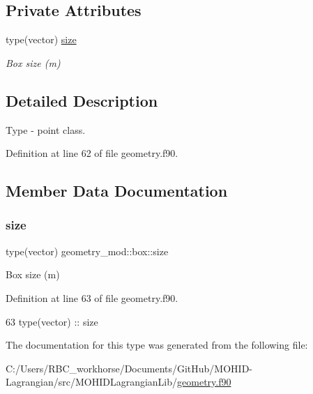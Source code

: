 \subsection*{Private Attributes}
\begin{DoxyCompactItemize}
\item 
type(vector) \mbox{\hyperlink{structgeometry__mod_1_1box_aca87e2761faa8b1ce447347a31fd26f9}{size}}
\begin{DoxyCompactList}\small\item\em Box size (m) \end{DoxyCompactList}\end{DoxyCompactItemize}


\subsection{Detailed Description}
Type -\/ point class. 

Definition at line 62 of file geometry.\+f90.



\subsection{Member Data Documentation}
\mbox{\label{structgeometry__mod_1_1box_aca87e2761faa8b1ce447347a31fd26f9}} 
\subsubsection{\texorpdfstring{size}{size}}
{\footnotesize\ttfamily type(vector) geometry\+\_\+mod\+::box\+::size\hspace{0.3cm}{\ttfamily [private]}}



Box size (m) 



Definition at line 63 of file geometry.\+f90.


\begin{DoxyCode}
63         \textcolor{keywordtype}{type}(vector) :: size
\end{DoxyCode}


The documentation for this type was generated from the following file\+:\begin{DoxyCompactItemize}
\item 
C\+:/\+Users/\+R\+B\+C\+\_\+workhorse/\+Documents/\+Git\+Hub/\+M\+O\+H\+I\+D-\/\+Lagrangian/src/\+M\+O\+H\+I\+D\+Lagrangian\+Lib/\mbox{\hyperlink{geometry_8f90}{geometry.\+f90}}\end{DoxyCompactItemize}
